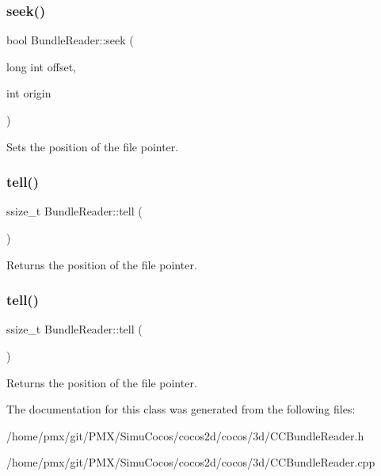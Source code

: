 \subsubsection{\texorpdfstring{seek()}{seek()}\hspace{0.1cm}{\footnotesize\ttfamily [2/2]}}
{\footnotesize\ttfamily bool Bundle\+Reader\+::seek (\begin{DoxyParamCaption}\item[{long int}]{offset,  }\item[{int}]{origin }\end{DoxyParamCaption})}

Sets the position of the file pointer. \mbox{\label{classBundleReader_ae2a6757717aa327231c2ac330ffcda5b}} 
\subsubsection{\texorpdfstring{tell()}{tell()}\hspace{0.1cm}{\footnotesize\ttfamily [1/2]}}
{\footnotesize\ttfamily ssize\+\_\+t Bundle\+Reader\+::tell (\begin{DoxyParamCaption}{ }\end{DoxyParamCaption})}

Returns the position of the file pointer. \mbox{\label{classBundleReader_ae2a6757717aa327231c2ac330ffcda5b}} 
\subsubsection{\texorpdfstring{tell()}{tell()}\hspace{0.1cm}{\footnotesize\ttfamily [2/2]}}
{\footnotesize\ttfamily ssize\+\_\+t Bundle\+Reader\+::tell (\begin{DoxyParamCaption}{ }\end{DoxyParamCaption})}

Returns the position of the file pointer. 

The documentation for this class was generated from the following files\+:\begin{DoxyCompactItemize}
\item 
/home/pmx/git/\+P\+M\+X/\+Simu\+Cocos/cocos2d/cocos/3d/C\+C\+Bundle\+Reader.\+h\item 
/home/pmx/git/\+P\+M\+X/\+Simu\+Cocos/cocos2d/cocos/3d/C\+C\+Bundle\+Reader.\+cpp\end{DoxyCompactItemize}
